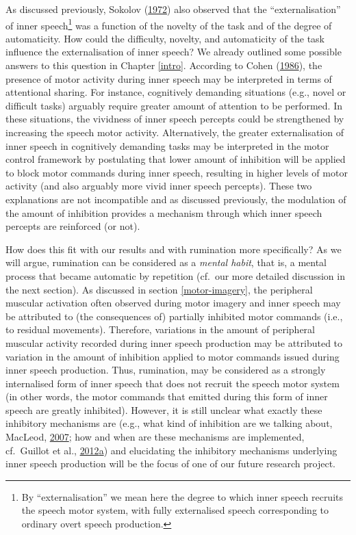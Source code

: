 \documentclass[a4paper,12pt,twoside,openright,oldfontcommands,final]{memoir}
\let\rmarkdownfootnote\footnote%
\def\footnote{\protect\rmarkdownfootnote}
\begin{document}
As discussed previously, Sokolov (\protect\hyperlink{ref-sokolov_inner_1972}{1972}) also observed that the \enquote{externalisation} of inner speech\footnote{By \enquote{externalisation} we mean here the degree to which inner speech recruits the speech motor system, with fully externalised speech corresponding to ordinary overt speech production.} was a function of the novelty of the task and of the degree of automaticity. How could the difficulty, novelty, and automaticity of the task influence the externalisation of inner speech? We already outlined some possible answers to this question in Chapter \ref{intro}. According to Cohen (\protect\hyperlink{ref-cohen_motor_1986}{1986}), the presence of motor activity during inner speech may be interpreted in terms of attentional sharing. For instance, cognitively demanding situations (e.g., novel or difficult tasks) arguably require greater amount of attention to be performed. In these situations, the vividness of inner speech percepts could be strengthened by increasing the speech motor activity. Alternatively, the greater externalisation of inner speech in cognitively demanding tasks may be interpreted in the motor control framework by postulating that lower amount of inhibition will be applied to block motor commands during inner speech, resulting in higher levels of motor activity (and also arguably more vivid inner speech percepts). These two explanations are not incompatible and as discussed previously, the modulation of the amount of inhibition provides a mechanism through which inner speech percepts are reinforced (or not).

How does this fit with our results and with rumination more specifically? As we will argue, rumination can be considered as a \emph{mental habit}, that is, a mental process that became automatic by repetition (cf.~our more detailed discussion in the next section). As discussed in section \ref{motor-imagery}, the peripheral muscular activation often observed during motor imagery and inner speech may be attributed to (the consequences of) partially inhibited motor commands (i.e., to residual movements). Therefore, variations in the amount of peripheral muscular activity recorded during inner speech production may be attributed to variation in the amount of inhibition applied to motor commands issued during inner speech production. Thus, rumination, may be considered as a strongly internalised form of inner speech that does not recruit the speech motor system (in other words, the motor commands that emitted during this form of inner speech are greatly inhibited). However, it is still unclear what exactly these inhibitory mechanisms are (e.g., what kind of inhibition are we talking about, MacLeod, \protect\hyperlink{ref-gorfein_concept_2007}{2007}; how and when are these mechanisms are implemented, cf.~Guillot et al., \protect\hyperlink{ref-guillot_imagining_2012}{2012}\protect\hyperlink{ref-guillot_imagining_2012}{a}) and elucidating the inhibitory mechanisms underlying inner speech production will be the focus of one of our future research project.
\end{document}

